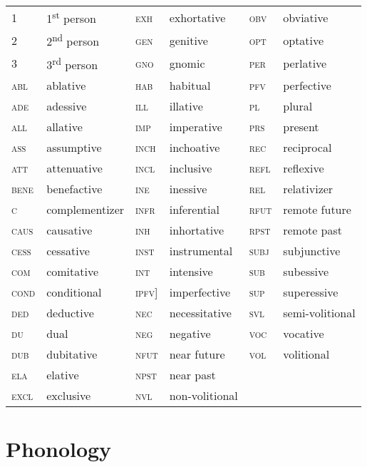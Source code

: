 \documentclass[11pt,a4paper,titlepage]{article}
\begin{document}
		\begin{tabular}{l l l l l l}
			1 & 1\textsuperscript{st} person & \textsc{exh} & exhortative & \textsc{obv} & obviative \\
			2 & 2\textsuperscript{nd} person & \textsc{gen} & genitive & \textsc{opt} & optative \\
			3 & 3\textsuperscript{rd} person & \textsc{gno} & gnomic & \textsc{per} & perlative \\
			\textsc{abl} & ablative & \textsc{hab} & habitual & \textsc{pfv} & perfective \\
			\textsc{ade} & adessive & \textsc{ill} & illative & \textsc{pl} & plural \\
			\textsc{all} & allative & \textsc{imp} & imperative & \textsc{prs} & present \\
			\textsc{ass} & assumptive & \textsc{inch} & inchoative & \textsc{rec} & reciprocal \\
			\textsc{att} & attenuative & \textsc{incl} & inclusive & \textsc{refl} & reflexive \\
			\textsc{bene} & benefactive & \textsc{ine} & inessive & \textsc{rel} & relativizer \\
			\textsc{c} & complementizer & \textsc{infr} & inferential & \textsc{rfut} & remote future \\
			\textsc{caus} & causative & \textsc{inh} & inhortative & \textsc{rpst} & remote past \\
			\textsc{cess} & cessative & \textsc{inst} & instrumental & \textsc{subj} & subjunctive \\
			\textsc{com} & comitative & \textsc{int} & intensive & \textsc{sub} & subessive \\
			\textsc{cond} & conditional & \textsc{ipfv]} & imperfective & \textsc{sup} & superessive \\
			\textsc{ded} & deductive & \textsc{nec} & necessitative & \textsc{svl} & semi-volitional \\
			\textsc{du} & dual & \textsc{neg} & negative & \textsc{voc} & vocative \\
			\textsc{dub} & dubitative & \textsc{nfut} & near future & \textsc{vol} & volitional \\
			\textsc{ela} & elative & \textsc{npst} & near past & & \\
			\textsc{excl} & exclusive & \textsc{nvl} & non-volitional & & \\
		\end{tabular}

	\section{Phonology}
\end{document}
